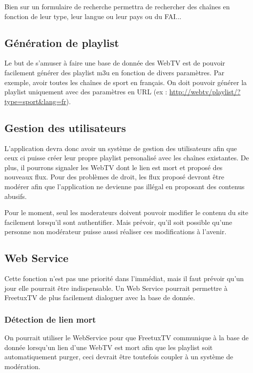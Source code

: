 \documentclass[10pt,a4paper]{article}
\begin{document}
Bien sur un formulaire de recherche permettra de rechercher des chaînes en fonction de leur type, leur langue ou leur pays ou du FAI...

\subsection{Génération de playlist}

Le but de s'amuser à faire une base de donnée des WebTV est de pouvoir facilement générer des playlist m3u en fonction de divers paramètres. Par exemple, avoir toutes les chaînes de sport en français. On doit pouvoir générer la playlist uniquement avec des paramètres en URL (ex : \url{http://webtv/playlist/?type=sport&lang=fr}).

\subsection{Gestion des utilisateurs}

L'application devra donc avoir un système de gestion des utilisateurs afin que ceux ci puisse créer leur propre playlist personalisé avec les chaînes existantes. De plus, il pourrons signaler les WebTV dont le lien est mort et proposé des nouveaux flux. Pour des problèmes de droit, les flux proposé devront être modérer afin que l'application ne devienne pas illégal en proposant des contenus abusifs.

Pour le moment, seul les moderateurs doivent pouvoir modifier le contenu du site facilement lorsqu'il sont authentifier. Mais prévoir, qu'il soit possible qu'une personne non modérateur puisse aussi réaliser ces modifications à l'avenir.

\subsection{Web Service}

Cette fonction n'est pas une priorité dans l'immédiat, mais il faut prévoir qu'un jour elle pourrait être indispensable. Un Web Service pourrait permettre à FreetuxTV de plus facilement dialoguer avec la base de donnée. 

\subsubsection{Détection de lien mort}

On pourrait utiliser le WebService pour que FreetuxTV communique à la base de donnée lorsqu'un lien d'une WebTV est mort afin que les playlist soit automatiquement purger, ceci devrait être toutefois coupler à un système de modération.
\end{document}
